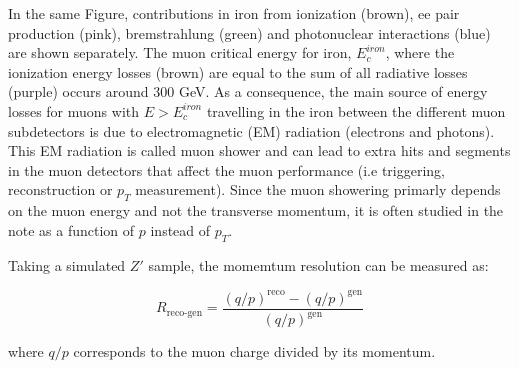 In the same Figure, contributions in iron from ionization (brown), ee pair production (pink), bremstrahlung (green) and photonuclear interactions (blue) are shown separately.  The muon critical energy for iron, $E^{iron}_{c}$, where the ionization energy losses (brown) are equal to the sum of all radiative losses (purple) occurs around 300 GeV. As a consequence, the main source of energy losses for muons with $E>E^{iron}_{c}$ travelling in the iron between the different muon subdetectors is due to electromagnetic (EM) radiation (electrons and photons). This EM radiation is called muon shower and can lead to extra hits and segments in the muon detectors that affect the muon performance (i.e triggering, reconstruction or $p_{T}$ measurement). Since the muon showering primarly depends on the muon energy and not the transverse momentum, it is often studied in the note as a function of $p$ instead of $p_{T}$.


Taking a simulated $Z'$ sample, the momemtum resolution can be measured as: 

\begin{equation}
\ensuremath{R_{\mathrm{reco}\textrm{-}\mathrm{gen}}} =
\frac{(q/p)^{\mathrm{reco}} - (q/p)^{\mathrm{gen}}}{(q/p)^{\mathrm{gen}}}
\label{resolution}
\end{equation}

where $q/p$ corresponds to the muon charge divided by its momentum.
